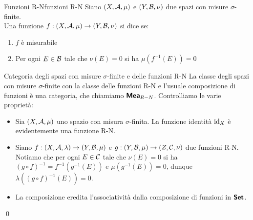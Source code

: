 \documentclass[openany]{book}
\begin{document}
\begin{definition}{Funzioni R-N}{funzioni R-N}
    Siano $(X,\mathcal{A},\mu)$ e $(Y,\mathcal{B},\nu)$ due spazi con misure $\sigma$-finite.\\
    Una funzione $f:(X,\mathcal{A},\mu)\to(Y,\mathcal{B},\nu)$ si dice  se:\begin{enumerate}
        \item $f$ è misurabile
        \item Per ogni $E \in \mathcal{B}$ tale che $\nu(E) = 0$ si ha $\mu(f^{-1}(E))=0$
    \end{enumerate}    
\end{definition}
\begin{remark}{Categoria degli spazi con misure $\sigma$-finite e delle funzioni R-N}{}
    La classe degli spazi con misure $\sigma$-finite con la classe delle funzioni R-N e l'usuale composizione di funzioni è una categoria, che chiamiamo $\text{\sffamily\textbf{Mea}}_{R-N}$.
    \proof
    Controlliamo le varie proprietà:
    \begin{itemize}
        \item Sia $(X,\mathcal{A},\mu)$ uno spazio con misura $\sigma$-finita. La funzione identità $\operatorname{id}_{X}$ è evidentemente una funzione R-N.
        \item Siano $f:(X,\mathcal{A},\lambda)\to (Y,\mathcal{B},\mu)$ e $g:(Y,\mathcal{B},\mu)\to(Z,\mathcal{C},\nu)$ due funzioni R-N. Notiamo che per ogni $E \in \mathcal{C}$ tale che $\nu(E) = 0$ si ha $(g\circ f)^{-1} = f^{-1}(g^{-1}(E))$ e $\mu(g^{-1}(E)) = 0$, dunque $\lambda((g\circ f)^{-1}(E))=0$.
        \item La composizione eredita l'associatività dalla composizione di funzioni in $\text{\sffamily\textbf{Set}}$.
        \end{itemize}
    \qed
\end{remark}

\end{document}

